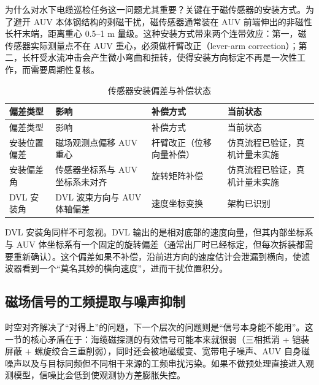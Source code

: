 为什么对水下电缆巡检任务这一问题尤其重要？关键在于磁传感器的安装方式。为了避开 AUV 本体钢结构的剩磁干扰，磁传感器通常装在 AUV 前端伸出的非磁性长杆末端，距离重心 0.5--1 m 量级。这种安装方式带来两个连带效应：第一，磁传感器实际测量点不在 AUV 重心，必须做杆臂改正（lever-arm correction）；第二，长杆受水流冲击会产生微小弯曲和扭转，使得安装方向标定不再是一次性工作，而需要周期性复核。

\begin{longtable}[]{@{}
  >{\raggedright\arraybackslash}p{}
  >{\raggedright\arraybackslash}p{}
  >{\raggedright\arraybackslash}p{}
  >{\raggedright\arraybackslash}p{}@{}}
\caption{传感器安装偏差与补偿状态}\label{tab:ch03-alignment}\tabularnewline
\toprule\noalign{}
偏差类型 & 影响 & 补偿方式 & 当前状态 \\
\midrule\noalign{}
\endfirsthead
\toprule\noalign{}
偏差类型 & 影响 & 补偿方式 & 当前状态 \\
\midrule\noalign{}
\endhead
\bottomrule\noalign{}
\endlastfoot
安装位置偏差 & 磁场观测点偏移 AUV 重心 & 杆臂改正（位移向量补偿） & 仿真流程已验证，真机计量未实施 \\
安装偏差角 & 传感器坐标系与 AUV 坐标系未对齐 & 旋转矩阵补偿 & 仿真流程已验证，真机计量未实施 \\
DVL 安装角 & DVL 波束方向与 AUV 体轴偏差 & 速度坐标变换 & 架构已识别 \\
\end{longtable}

DVL 安装角同样不可忽视。DVL 输出的是相对底部的速度向量，但其内部坐标系与 AUV 体坐标系有一个固定的旋转偏差（通常出厂时已经标定，但每次拆装都需要重新确认）。这个偏差如果不补偿，沿前进方向的速度估计会泄漏到横向，使滤波器看到一个``莫名其妙的横向速度''，进而干扰位置积分。

\subsection{磁场信号的工频提取与噪声抑制}\label{sec:ch03-3-2-3}

时空对齐解决了``对得上''的问题，下一个层次的问题则是``信号本身能不能用''。这一节的核心矛盾在于：海缆磁探测的有效信号可能本来就很弱（三相抵消 + 铠装屏蔽 + 螺旋绞合三重削弱），同时还会被地磁缓变、宽带电子噪声、AUV 自身磁噪声以及与目标同频但不同相干来源的工频串扰污染。如果不做预处理直接进入观测模型，信噪比会低到使观测协方差膨胀失控。

